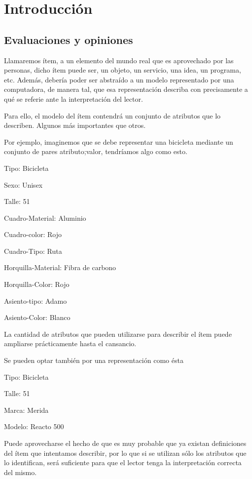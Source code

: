 \chapter{Introducción}
\label{chapter:introduccion}

\section{Evaluaciones y opiniones}
\label{section:evaluaciones-cruzadas}
Llamaremos ítem, a un elemento del mundo real que es aprovechado por las personas, dicho ítem puede ser, un objeto, un servicio, una idea, un programa, etc. Además, debería poder ser abstraído a un modelo representado por una computadora, de manera tal, que esa representación describa con precisamente a qué se referie ante la interpretación del lector. 

Para ello, el modelo del ítem contendrá un conjunto de atributos que lo describen. Algunos más importantes que otros.

Por ejemplo, imaginemos que se debe representar una bicicleta mediante un conjunto de pares atributo;valor, tendríamos algo como esto.

Tipo: Bicicleta

Sexo: Unisex

Talle: 51

Cuadro-Material: Aluminio

Cuadro-color: Rojo

Cuadro-Tipo: Ruta

Horquilla-Material: Fibra de carbono

Horquilla-Color: Rojo

Asiento-tipo: Adamo 

Asiento-Color: Blanco

La cantidad de atributos que pueden utilizarse para describir el ítem puede ampliarse prácticamente hasta el cansancio. 

Se pueden optar también por una representación como ésta

Tipo: Bicicleta

Talle: 51 

Marca: Merida

Modelo: Reacto 500

Puede aprovecharse el hecho de que es muy probable que ya existan definiciones del ítem que intentamos describir, por lo que si se utilizan sólo los atributos que lo identifican, será suficiente para que el lector tenga la interpretación correcta del mismo. 

